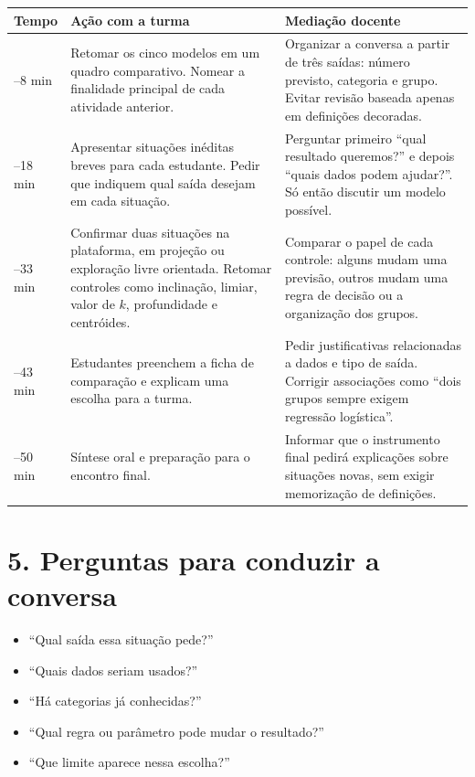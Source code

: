 \documentclass[12pt,a4paper]{article}
\begin{document}
\renewcommand{\arraystretch}{1.18}
\begin{tabularx}{\linewidth}{|>{\centering\arraybackslash}p{1.65cm}|p{5.0cm}|X|}
\hline
\textbf{Tempo} & \textbf{Ação com a turma} & \textbf{Mediação docente} \\
\hline
0--8 min & Retomar os cinco modelos em um quadro comparativo. Nomear a finalidade principal de cada atividade anterior. & Organizar a conversa a partir de três saídas: número previsto, categoria e grupo. Evitar revisão baseada apenas em definições decoradas. \\
\hline
8--18 min & Apresentar situações inéditas breves para cada estudante. Pedir que indiquem qual saída desejam em cada situação. & Perguntar primeiro ``qual resultado queremos?'' e depois ``quais dados podem ajudar?''. Só então discutir um modelo possível. \\
\hline
18--33 min & Confirmar duas situações na plataforma, em projeção ou exploração livre orientada. Retomar controles como inclinação, limiar, valor de $k$, profundidade e centróides. & Comparar o papel de cada controle: alguns mudam uma previsão, outros mudam uma regra de decisão ou a organização dos grupos. \\
\hline
33--43 min & Estudantes preenchem a ficha de comparação e explicam uma escolha para a turma. & Pedir justificativas relacionadas a dados e tipo de saída. Corrigir associações como ``dois grupos sempre exigem regressão logística''. \\
\hline
43--50 min & Síntese oral e preparação para o encontro final. & Informar que o instrumento final pedirá explicações sobre situações novas, sem exigir memorização de definições. \\
\hline
\end{tabularx}

\section*{5. Perguntas para conduzir a conversa}

\begin{itemize}
  \item ``Qual saída essa situação pede?''
  \item ``Quais dados seriam usados?''
  \item ``Há categorias já conhecidas?''
  \item ``Qual regra ou parâmetro pode mudar o resultado?''
  \item ``Que limite aparece nessa escolha?''
\end{itemize}
\end{document}
